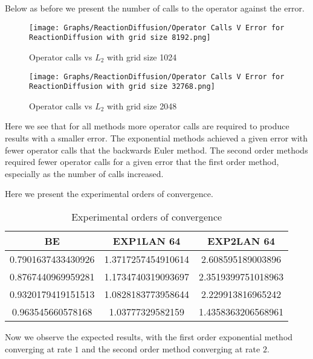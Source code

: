 Below as before we present the number of calls to the operator against the error.
\begin{figure}[H]
    \centering
    \begin{minipage}{0.49\textwidth}
        \texttt{[image: Graphs/ReactionDiffusion/Operator Calls V Error for ReactionDiffusion with grid size 8192.png]} %
        \caption{Operator calls vs $L_2$ with grid size 1024}
        \label{fig:plot1}
    \end{minipage}\hfill
    \centering
    \begin{minipage}{0.49\textwidth}
        \texttt{[image: Graphs/ReactionDiffusion/Operator Calls V Error for ReactionDiffusion with grid size 32768.png]} %
        \caption{Operator calls vs $L_2$ with grid size 2048}
        \label{fig:plot2}
    \end{minipage}\hfill
\end{figure}
Here we see that for all methods more operator calls are required to produce results with a smaller error.
The exponential methods achieved a given error with fewer operator calls that the backwards Euler method.
The second order methods required fewer operator calls for a given error that the first order method, especially as the number of calls increased.


Here we present the experimental orders of convergence.
\begin{table}[H]
    \centering
    \begin{tabular}{| c | c | c |}
    \hline
    BE & EXP1LAN 64 & EXP2LAN 64 \\
    \hline
    0.7901637433430926 & 1.3717257454910614    & 2.608595189003896 \\
    0.8767440969959281 & 1.1734740319093697    & 2.3519399751018963 \\
    0.9320179419151513 & 1.0828183773958644   & 2.229913816965242\\
    0.963545660578168  & 1.03777329582159   & 1.4358363206568961 \\
    \hline
    \end{tabular}
    \caption{Experimental orders of convergence}
    \label{tab:reduced_data}
\end{table}

Now we observe the expected results, with the first order exponential method converging at rate $1$ and the second order method converging at rate $2$.